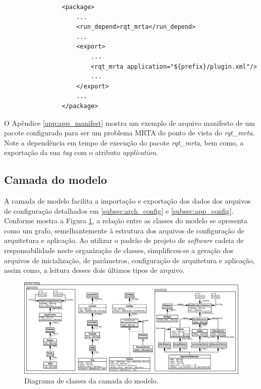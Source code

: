             \begin{lstlisting}
                <package>
                    ...
                    <run_depend>rqt_mrta</run_depend>
                    ...
                    <export>
                        ...
                        <rqt_mrta application="${prefix}/plugin.xml"/>
                        ...
                    </export>
                    ...
                </package>
            \end{lstlisting}
            
            O Apêndice \ref{app:app_manifest} mostra um exemplo de arquivo manifesto de um pacote configurado para ser um problema MRTA do ponto de vista do \textit{rqt\_mrta}. Note a dependência em tempo de execução do pacote \textit{rqt\_mrta}, bem como, a exportação da sua \textit{tag} com o atributo \textit{application}.
        
        \subsection{Camada do modelo} \label{subset:rqt_mrta_model}
            A camada de modelo facilita a importação e exportação dos dados dos arquivos de configuração detalhados em \ref{subsec:arch_config} e \ref{subsec:app_config}. Conforme mostra a Figura \ref{fig:rqt_mrta_model_uml}, a relação entre as classes do modelo se apresenta como um grafo, semelhantemente à estrutura dos arquivos de configuração de arquitetura e aplicação. Ao utilizar o padrão de projeto de \textit{software} cadeia de responsabilidade \cite{ref:gamma1993design} neste organização de classes, simplificou-se a geração dos arquivos de inicialização, de parâmetros, configuração de arquitetura e aplicação, assim como, a leitura desses dois últimos tipos de arquivo.
            
            \begin{figure}[p]
                \centering
                \includegraphics[width=.97\textheight,angle=90]{Figuras/3_desenvolvimento/rqt_mrta_model_uml.eps}
                \caption{Diagrama de classes da camada do modelo.} \label{fig:rqt_mrta_model_uml}
            \end{figure}
            
